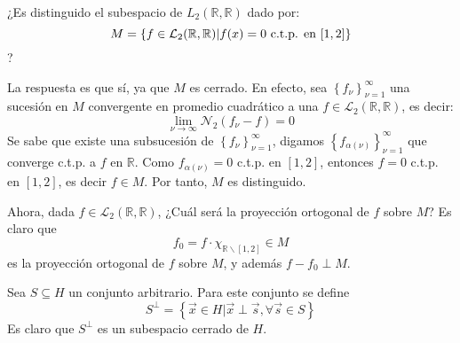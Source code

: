 \documentclass[12pt]{report}
\newcounter{it}
\theoremstyle{largebreak}
\begin{document}
    \begin{exa}
        ¿Es distinguido el subespacio de $L_2(\mathbb{R},\mathbb{R})$ dado por:
        \begin{equation*}
            M=\left\{f\in\mathcal{L}_2(\mathbb{R},\mathbb{R})| f(x)=0\textup{ c.t.p. en }[1,2] \right\}
        \end{equation*}
        ?
        
        La respuesta es que sí, ya que $M$ es cerrado. En efecto, sea $\left\{f_\nu\right\}_{\nu=1}^{\infty}$ una sucesión en $M$ convergente en promedio cuadrático a una $f\in\mathcal{L}_2(\mathbb{R},\mathbb{R})$, es decir:
        \begin{equation*}
            \lim_{\nu\rightarrow\infty}\mathcal{N}_2(f_\nu-f)=0
        \end{equation*}
        Se sabe que existe una subsucesión de $\left\{f_\nu\right\}_{\nu=1}^{\infty}$, digamos $\left\{f_{\alpha(\nu)}\right\}_{\nu=1}^{\infty}$ que converge c.t.p. a $f$ en $\mathbb{R}$. Como $f_{\alpha(\nu)}=0$ c.t.p. en $[1,2]$, entonces $f=0$ c.t.p. en $[1,2]$, es decir $f\in M$. Por tanto, $M$ es distinguido.

        Ahora, dada $f\in\mathcal{L}_2(\mathbb{R},\mathbb{R})$, ¿Cuál será la proyección ortogonal de $f$ sobre $M$? Es claro que
        \begin{equation*}
            f_0=f\cdot\chi_{\mathbb{R}\backslash[1,2]}\in M
        \end{equation*}
        es la proyección ortogonal de $f$ sobre $M$, y además $f-f_0\perp M$.
    \end{exa}

    \begin{mydef}
        Sea $S\subseteq H$ un conjunto arbitrario. Para este conjunto se define
        \begin{equation*}
            S^{\perp}=\left\{\vec{x}\in H|\vec{x}\perp\vec{s},\forall\vec{s}\in S \right\}
        \end{equation*}
        Es claro que $S^\perp$ es un subespacio cerrado de $H$.
    \end{mydef}
\end{document}
